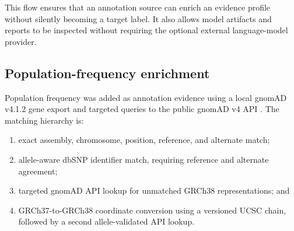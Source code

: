 \documentclass[12pt,a4paper]{article}
\begin{document}
\begin{center}
\end{center}

This flow ensures that an annotation source can enrich an evidence profile
without silently becoming a target label. It also allows model artifacts and
reports to be inspected without requiring the optional external language-model
provider.

\subsection{Population-frequency enrichment}
Population frequency was added as annotation evidence using a local gnomAD
v4.1.2 gene export and targeted queries to the public gnomAD v4 API
\cite{gnomadapi}. The matching hierarchy is:

\begin{enumerate}
\item exact assembly, chromosome, position, reference, and alternate match;
\item allele-aware dbSNP identifier match, requiring reference and alternate
agreement;
\item targeted gnomAD API lookup for unmatched GRCh38 representations; and
\item GRCh37-to-GRCh38 coordinate conversion using a versioned UCSC chain,
followed by a second allele-validated API lookup.
\end{enumerate}
\end{document}
